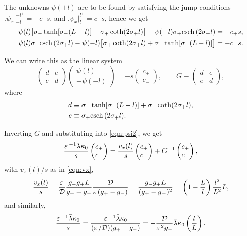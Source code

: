 The unknowns $\psi(\pm l)$ are to be found by satisfying the jump conditions $\Big.\psi_x\Big|_{-l^-}^{-l^+} = - c_-s$, and $\Big.\psi_x\Big|_{l^-}^{l^+} = c_+s$, hence we get
% 
\begin{equation*}
	\begin{split}
	  \psi(l)\big[\sigma_-\tanh[\sigma_-(L-l)] + \sigma_+\coth(2\sigma_+l)\big] - \psi(-l)\sigma_+\mathrm{csch} \,(2\sigma_+l) &= -c_+s,\\
	  \psi(l)\sigma_+\mathrm{csch} \,(2\sigma_+l) - \psi(-l)\big[\sigma_+\coth(2\sigma_+l)  + \sigma_-\tanh[\sigma_-(L-l)]\big] &= -c_-s.
	\end{split}
\end{equation*}
% 

We can write this as the linear system
% 
\[
  \begin{pmatrix} d&e\\e&d \end{pmatrix}\begin{pmatrix} \psi(l)\\-\psi(-l) \end{pmatrix} = 
  -s \begin{pmatrix} c_+\\c_- \end{pmatrix},\qquad
  G \equiv \begin{pmatrix} d&e\\e&d \end{pmatrix},
\]
% 
where
% 
\[
  \begin{split}
    d&\equiv \sigma_-\tanh[\sigma_-(L-l)] + \sigma_+\coth(2\sigma_+l),\\
	e&\equiv \sigma_+\mathrm{csch} \,(2\sigma_+l).
  \end{split}
\]
% 

Inverting $G$ and substituting into \eqref{eqn:psi2}, we get
% 
\begin{equation*}
	\begin{split}
	  \frac{\varepsilon\,^{-1}\bar{\lambda}\kappa_0}{s}\begin{pmatrix} c_+\\c_- \end{pmatrix} = \frac{v_x(l)}{s}\begin{pmatrix} c_+\\c_- \end{pmatrix} + G^{-1}\begin{pmatrix} c_+\\c_- \end{pmatrix},
	\end{split}
\end{equation*}
% 
with $v_x(l)/s$ as in \eqref{eqn:vx},
% 
\[
  \frac{v_x(l)}{s} = \frac{\varepsilon\,}{\mathcal{D}}\frac{g_-g_+L}{g_+-g_-}\frac{\mathcal{D}}{\varepsilon\,(g_+-g_-)} = \frac{g_-g_+L}{(g_+-g_-)^2} = \left(1-\frac{L}{l} \right)\frac{l^2}{L^2}L,
\]
% 
and similarly,
% 
\[
  \frac{\varepsilon\,^{-1}\bar{\lambda}\kappa_0}{s} = \frac{\varepsilon\,^{-1}\bar{\lambda}\kappa_0}{(\varepsilon\,/\mathcal{D})(g_+-g_-)} = - \frac{\mathcal{D}}{\varepsilon\,^2g_-}\bar{\lambda}\kappa_0\left(\frac{l}{L}\right).
\]
% 

